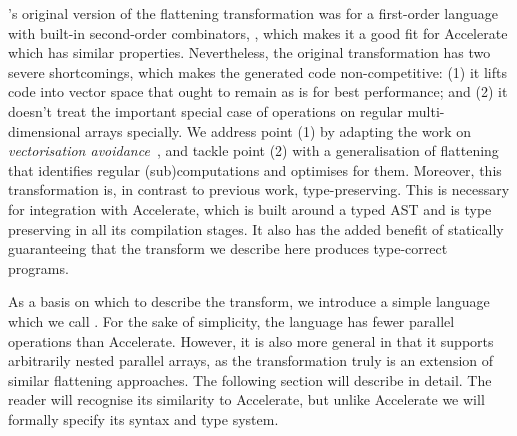 
\citet{Blelloch:compiling1988}'s original version of the flattening transformation was for a first-order language with built-in second-order combinators, \nesl{}, which makes it a good fit for Accelerate which has similar properties. Nevertheless, the original transformation has two severe shortcomings, which makes the generated code non-competitive: (1) it lifts code into vector space that ought to remain as is for best performance; and (2) it doesn't treat the important special case of operations on regular multi-dimensional arrays specially. We address point (1) by adapting the work on \emph{vectorisation avoidance}~\citep{Keller:avoidance}, and tackle point (2) with a generalisation of flattening that identifies regular (sub)computations and optimises for them. Moreover, this transformation is, in contrast to previous work, type-preserving. This is necessary for integration with Accelerate, which is built around a typed AST and is type preserving in all its compilation stages\cite{McDonell:2015:acc-llvm}. It also has the added benefit of statically guaranteeing that the transform we describe here produces type-correct programs.

As a basis on which to describe the transform, we introduce a simple language which we call \ndp{}. For the sake of simplicity, the language has fewer parallel operations than Accelerate. However, it is also more general in that it supports arbitrarily nested parallel arrays, as the transformation truly is an extension of similar flattening approaches. The following section will describe \ndp{} in detail. The reader will recognise its similarity to Accelerate, but unlike Accelerate we will formally specify its syntax and type system.

\section{\ndp{}}

